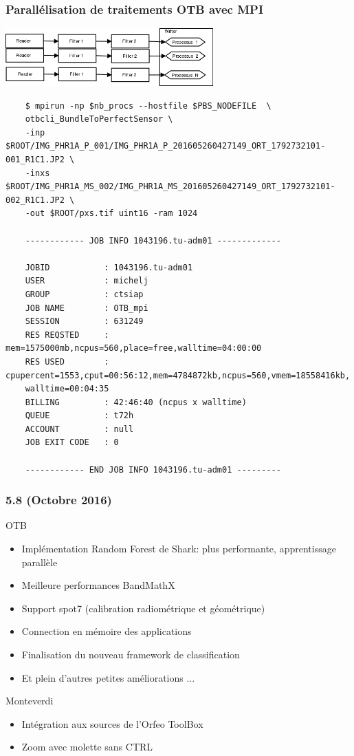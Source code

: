 \documentclass[8pt]{beamer}
\begin{document}
\begin{frame}[fragile]
\frametitle{Parallélisation de traitements OTB avec MPI}
\begin{center}
  \vspace{-0.5cm}
  \includegraphics[width=0.6\textwidth]{images/mpi.png}
  \begin{scriptsize}
\begin{verbatim}
    $ mpirun -np $nb_procs --hostfile $PBS_NODEFILE  \
    otbcli_BundleToPerfectSensor \
    -inp $ROOT/IMG_PHR1A_P_001/IMG_PHR1A_P_201605260427149_ORT_1792732101-001_R1C1.JP2 \
    -inxs $ROOT/IMG_PHR1A_MS_002/IMG_PHR1A_MS_201605260427149_ORT_1792732101-002_R1C1.JP2 \
    -out $ROOT/pxs.tif uint16 -ram 1024

    ------------ JOB INFO 1043196.tu-adm01 -------------
    
    JOBID           : 1043196.tu-adm01
    USER            : michelj
    GROUP           : ctsiap
    JOB NAME        : OTB_mpi
    SESSION         : 631249
    RES REQSTED     : mem=1575000mb,ncpus=560,place=free,walltime=04:00:00
    RES USED        : cpupercent=1553,cput=00:56:12,mem=4784872kb,ncpus=560,vmem=18558416kb,
    walltime=00:04:35
    BILLING         : 42:46:40 (ncpus x walltime)
    QUEUE           : t72h
    ACCOUNT         : null
    JOB EXIT CODE   : 0
    
    ------------ END JOB INFO 1043196.tu-adm01 ---------
\end{verbatim}
\end{scriptsize}
\end{center}
\end{frame}

\begin{frame}
\frametitle{5.8 (Octobre 2016)}
\begin{block}{OTB}
\begin{itemize}
\item Implémentation Random Forest de Shark: plus performante, apprentissage parallèle
\item Meilleure performances BandMathX
\item Support spot7 (calibration radiométrique et géométrique)
\item Connection en mémoire des applications
\item Finalisation  du nouveau framework de classification
\item Et plein d'autres petites améliorations ...
\end{itemize}
\end{block}

\begin{block}{Monteverdi}
\begin{itemize}
\item Intégration aux sources de l'Orfeo ToolBox
\item Zoom avec molette sans CTRL
\end{itemize}
\end{block}
\end{frame}
\end{document}
